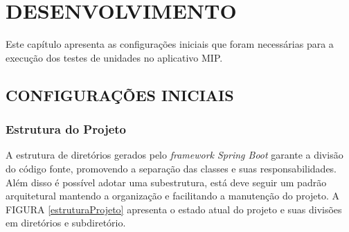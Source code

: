 



\chapter{DESENVOLVIMENTO}

Este capítulo apresenta as configurações iniciais que foram necessárias para a execução dos testes de unidades no aplicativo MIP. 

\section{CONFIGURAÇÕES INICIAIS}

\subsection{Estrutura do Projeto}



A estrutura de diretórios gerados pelo \textit{framework Spring Boot} garante a divisão do código fonte, promovendo a separação das classes e suas responsabilidades. Além disso é possível adotar uma subestrutura, está deve seguir um padrão arquitetural mantendo a organização e facilitando a manutenção do projeto. A FIGURA \ref{estruturaProjeto} apresenta o estado atual do projeto e suas divisões em diretórios e subdiretório. 


